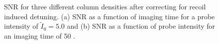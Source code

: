 \begin{figure}
\caption{SNR for three different column densities after correcting for recoil induced detuning. (a) SNR as a function of imaging time for a probe intensity of $\tilde{I}_0=5.0$ and (b) SNR as a function of probe intensity for an imaging time of 50 \us{}.}
\label{fig:SNR}
\end{figure}

